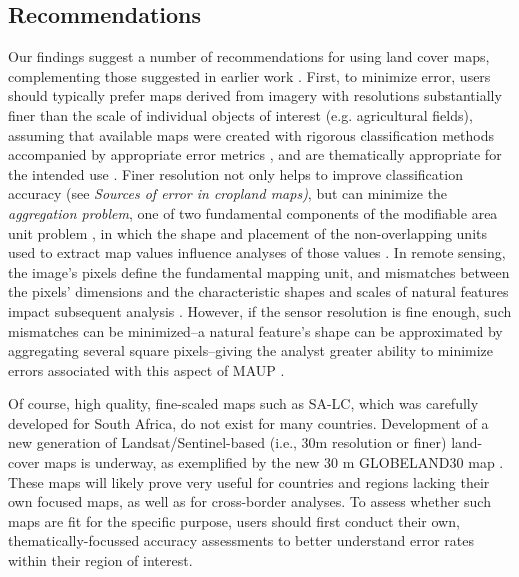 \documentclass[12 pt, titlepage, a4paper]{article}
\begin{document}
\subsection*{Recommendations}
\vspace{-0.2 cm}
Our findings suggest a number of recommendations for using land cover maps, complementing those suggested in earlier work \citep{verburg_challenges_2011}. First, to minimize error, users should typically prefer maps derived from imagery with resolutions substantially finer than the scale of individual objects of interest (e.g. agricultural fields), assuming that available maps were created with rigorous classification methods accompanied by appropriate error metrics \citep{olofsson_good_2014}, and are thematically appropriate for the intended use \citep{verburg_challenges_2011}. Finer resolution not only helps to improve classification accuracy (see \emph{Sources of error in cropland maps)}, but can minimize the \emph{aggregation problem}, one of two fundamental components of the modifiable area unit problem \citep[MAUP; ][]{openshaw_million_1979}, in which the shape and placement of the non-overlapping units used to extract map values influence analyses of those values \citep{dark_modifiable_2007, marceau_scale_1999}. In remote sensing, the image's pixels define the fundamental mapping unit, and mismatches between the pixels' dimensions and the characteristic shapes and scales of natural features impact subsequent analysis \citep{dark_modifiable_2007}. However, if the sensor resolution is fine enough, such mismatches can be minimized--a natural feature's shape can be approximated by aggregating several square pixels--giving the analyst greater ability to minimize errors associated with this aspect of MAUP \citep{dark_modifiable_2007, hay_comparison_2003}. 

Of course, high quality, fine-scaled maps such as SA-LC, which was carefully developed for South Africa, do not exist for many countries. Development of a new generation of Landsat/Sentinel-based (i.e., 30m resolution or finer) land-cover maps is underway, as exemplified by the new 30 m GLOBELAND30 map \citep{chen_global_2015}. These maps will likely prove very useful for countries and regions lacking their own focused maps, as well as for cross-border analyses. To assess whether such maps are fit for the specific purpose, users should first conduct their own, thematically-focussed accuracy assessments to better understand error rates within their region of interest. %
\end{document}
